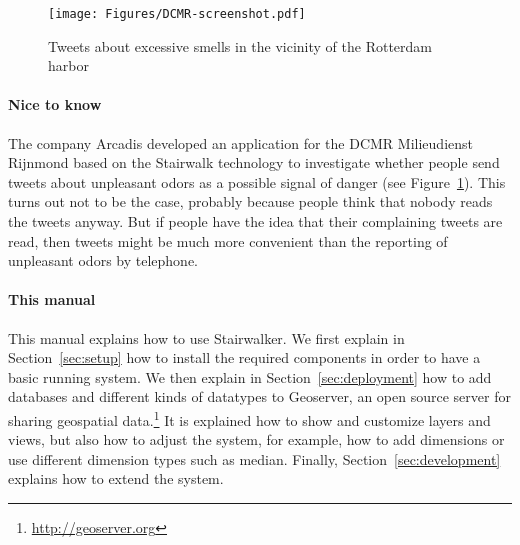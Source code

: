 \begin{figure}[t]
\centering
\texttt{[image: Figures/DCMR-screenshot.pdf]}
\caption{Tweets about excessive smells in the vicinity of the Rotterdam
harbor}
\label{fig:DCMR-screenshot}
\end{figure}

\paragraph{Nice to know}
The company Arcadis developed an application for the DCMR Milieudienst
Rijnmond based on the Stairwalk technology to investigate whether people
send tweets about unpleasant odors as a possible signal of danger (see
Figure~\ref{fig:DCMR-screenshot}). This turns out not to be the case,
probably because people think that nobody reads the tweets anyway. But if
people have the idea that their complaining tweets are read, then tweets
might be much more convenient than the reporting of unpleasant odors by
telephone.

\paragraph{This manual}

This manual explains how to use Stairwalker.  We first explain in
Section~\ref{sec:setup} how to install the required components in order to
have a basic running system.  We then explain in
Section~\ref{sec:deployment} how to add databases and different kinds of
datatypes to Geoserver, an open source server for sharing geospatial
data.\footnote{\url{http://geoserver.org}} It is explained how to show and
customize layers and views, but also how to adjust the system, for example,
how to add dimensions or use different dimension types such as median.
Finally, Section~\ref{sec:development} explains how to extend the system.
